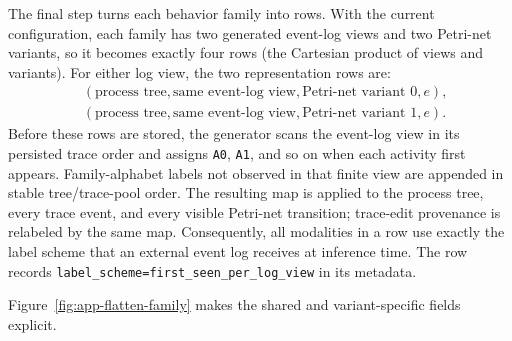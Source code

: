 \documentclass[manuscript,screen,nonacm]{acmart}
\begin{document}
The final step turns each behavior family into rows. With the current
configuration, each family has two generated event-log views and two Petri-net
variants, so it becomes exactly four rows (the Cartesian product of views and
variants). For either log view, the two representation rows are:
\[
\begin{aligned}
  &(\text{process tree}, \text{same event-log view},
    \text{Petri-net variant 0}, e),\\
  &(\text{process tree}, \text{same event-log view},
    \text{Petri-net variant 1}, e).
\end{aligned}
\]
Before these rows are stored, the generator scans the event-log view in its
persisted trace order and assigns \texttt{A0}, \texttt{A1}, and so on when each
activity first appears. Family-alphabet labels not observed in that finite view
are appended in stable tree/trace-pool order. The resulting map is applied to
the process tree, every trace event, and every visible Petri-net transition;
trace-edit provenance is relabeled by the same map. Consequently, all
modalities in a row use exactly the label scheme that an external event log
receives at inference time. The row records
\texttt{label\_scheme=first\_seen\_per\_log\_view} in its metadata.

Figure~\ref{fig:app-flatten-family} makes the shared and variant-specific fields
explicit.
\end{document}
